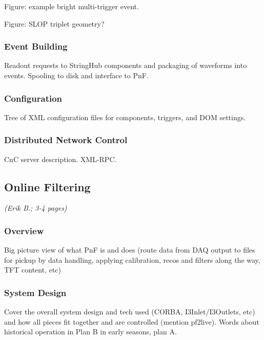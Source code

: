 Figure: example bright multi-trigger event.  

Figure: SLOP triplet geometry?

\subsubsection{Event Building}

Readout requests to StringHub components and packaging of waveforms into
events.  Spooling to disk and interface to PnF.


\subsubsection{Configuration}

Tree of XML configuration files for components, triggers, and DOM settings.  

\subsubsection{Distributed Network Control}

CnC server description.  XML-RPC.  %

\subsection{Online Filtering}
\textsl{(Erik B.; 3-4 pages)}
\subsubsection{Overview}
Big picture view of what PnF is and does (route data from DAQ output to
files for pickup by data handling, applying calibration, recos and
filters along the way, TFT content, etc)

\subsubsection{System Design}
Cover the overall system design and tech used (CORBA, I3Inlet/I3Outlets,
etc) and how all pieces fit together and are controlled (mention
pf2live). Words about historical operation in Plan B in early seasons,
plan A.

